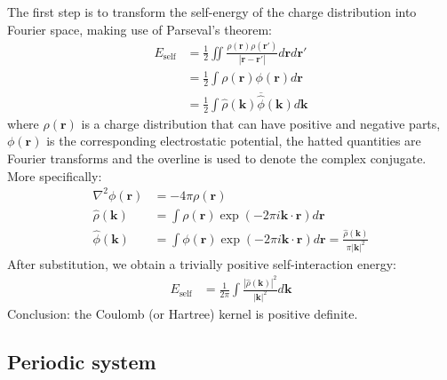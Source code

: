 \documentclass[a4paper,12pt,parskip=half]{scrartcl}
\begin{document}
The first step is to transform the self-energy of the charge distribution into Fourier space, making use of Parseval's theorem:
%
\begin{align}
    E_\text{self}
        &= \frac{1}{2} \iint \frac{ \rho(\mathbold{r}) \rho(\mathbold{r}') }{| \mathbold{r} - \mathbold{r}' |} d\mathbold{r} d\mathbold{r}' \\
        &= \frac{1}{2} \int \rho(\mathbold{r}) \phi(\mathbold{r}) d\mathbold{r} \\
        &= \frac{1}{2} \int \hat{\rho}(\mathbold{k}) \overline{\hat{\phi}}(\mathbold{k}) d\mathbold{k}
\end{align}
%
where $\rho(\mathbold{r})$ is a charge distribution that can have positive and negative parts, $\phi(\mathbold{r})$ is the corresponding electrostatic potential, the hatted quantities are Fourier transforms and the overline is used to denote the complex conjugate. More specifically:
%
\begin{align}
    \nabla^2 \phi(\mathbold{r}) &= -4\pi \rho(\mathbold{r}) \\
    \hat{\rho}(\mathbold{k}) &= \int \rho(\mathbold{r}) \exp(-2\pi i \mathbold{k} \cdot \mathbold{r}) d\mathbold{r} \\
    \hat{\phi}(\mathbold{k}) &= \int \phi(\mathbold{r}) \exp(-2\pi i \mathbold{k} \cdot \mathbold{r}) d\mathbold{r} = \frac{\hat{\rho}(\mathbold{k})}{\pi |\mathbold{k}|^2}
\end{align}
%
After substitution, we obtain a trivially positive self-interaction energy:
%
\begin{align}
    E_\text{self} &= \frac{1}{2\pi} \int \frac{ |\hat{\rho}(\mathbold{k})|^2 }{|\mathbold{k}|^2} d\mathbold{k}
\end{align}
%
Conclusion: the Coulomb (or Hartree) kernel is positive definite.


\subsection{Periodic system}
\end{document}
